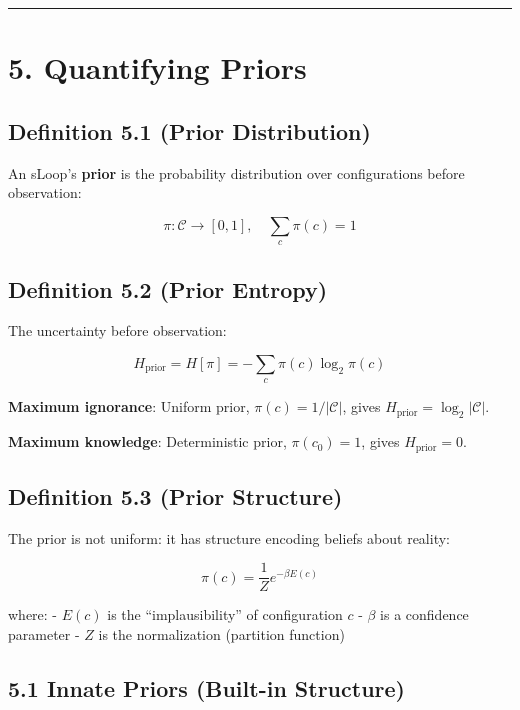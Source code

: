 \documentclass[
  11pt,
  letterpaper,
  twoside,
  openany]{book}
\makeatletter
\let\orig@section\section
\renewcommand{\section}{\needspace{8\baselineskip}\orig@section}
\let\orig@subsection\subsection
\renewcommand{\subsection}{\needspace{6\baselineskip}\orig@subsection}
\makeatother
\begin{document}
\begin{center}\rule{0.5\linewidth}{0.5pt}\end{center}

\section{5. Quantifying Priors}\label{quantifying-priors}

\subsection{Definition 5.1 (Prior
Distribution)}\label{definition-5.1-prior-distribution}

An sLoop's \textbf{prior} is the probability distribution over
configurations before observation:

\[\pi: \mathcal{C} \to [0, 1], \quad \sum_c \pi(c) = 1\]

\subsection{Definition 5.2 (Prior
Entropy)}\label{definition-5.2-prior-entropy}

The uncertainty before observation:

\[H_{\text{prior}} = H[\pi] = -\sum_c \pi(c) \log_2 \pi(c)\]

\textbf{Maximum ignorance}: Uniform prior, \(\pi(c) = 1/|\mathcal{C}|\),
gives \(H_{\text{prior}} = \log_2 |\mathcal{C}|\).

\textbf{Maximum knowledge}: Deterministic prior, \(\pi(c_0) = 1\), gives
\(H_{\text{prior}} = 0\).

\subsection{Definition 5.3 (Prior
Structure)}\label{definition-5.3-prior-structure}

The prior is not uniform: it has structure encoding beliefs about
reality:

\[\pi(c) = \frac{1}{Z} e^{-\beta E(c)}\]

where: - \(E(c)\) is the ``implausibility'' of configuration \(c\) -
\(\beta\) is a confidence parameter - \(Z\) is the normalization
(partition function)

\subsection{5.1 Innate Priors (Built-in
Structure)}\label{innate-priors-built-in-structure}
\end{document}
